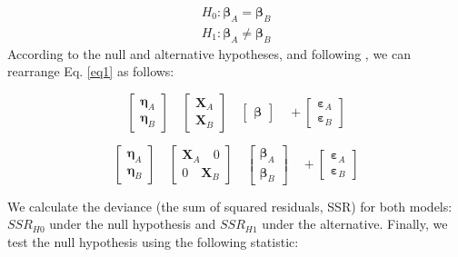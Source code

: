 \begin{align}
\label{eq2}
H_0: \boldsymbol{\beta}_A = \boldsymbol{\beta}_B \\
H_1: \boldsymbol{\beta}_A \ne \boldsymbol{\beta}_B
\end{align}
According  to the null and alternative hypotheses, and following \citet{Lebart79},  we can rearrange Eq. \ref{eq1} as follows:  

\begin{equation}
\label{eq22}
\left[\begin{array}{l}
\boldsymbol{\eta}_A \\
\boldsymbol{\eta}_B 
\end{array}\right] \quad
\left[\begin{array}{l}
\textbf{X}_A \\
\textbf{X}_B 
\end{array}\right] \quad
\left[\begin{array}{l}
\boldsymbol{\beta}
\end{array}\right]  \quad +
\left[\begin{array}{l}
\boldsymbol{\varepsilon}_A \\
\boldsymbol{\varepsilon}_B 
\end{array}\right] 
\end{equation}

\begin{equation}
\label{eq23}
\left[\begin{array}{l}
\boldsymbol{\eta}_A \\
\boldsymbol{\eta}_B 
\end{array}\right] \quad
\left[\begin{array}{cc}
\textbf{X}_A \quad0\\
0 \quad\textbf{X}_B 
\end{array}\right] \quad
\left[\begin{array}{l}
\boldsymbol{\beta}_A \\
\boldsymbol{\beta}_B
\end{array}\right]  \quad +
\left[\begin{array}{l}
\boldsymbol{\varepsilon}_A \\
\boldsymbol{\varepsilon}_B 
\end{array}\right] 
\end{equation}

We calculate the deviance (the sum of squared residuals, SSR) for both models: $SSR_{H0}$ under the null hypothesis and $SSR_{H1}$ under the alternative. Finally, we test the null hypothesis using the following statistic:

